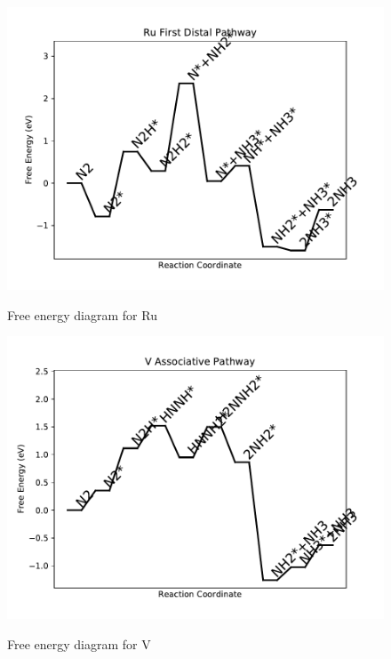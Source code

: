\documentclass{article}
\begin{document}
\begin{figure}
\includegraphics[width=1\linewidth]{data/plots/Ru_distal_1.pdf}
\label{fig:Ru_distal_1}
\caption{Free energy diagram for Ru}
\end{figure}

\clearpage
\begin{figure}
\includegraphics[width=1\linewidth]{data/plots/V_associative.pdf}
\label{fig:V_associative}
\caption{Free energy diagram for V}
\end{figure}
\end{document}
